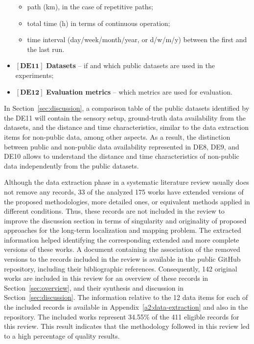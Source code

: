 \begin{itemize}[nosep]
\begin{itemize}[nosep]
  \item path (km), in the case of repetitive paths;
  \item total time (h) in terms of continuous operation;
  \item time interval (day/week/month/year, or d/w/m/y) between the first and the last run.
  \end{itemize}
\item $\left[\textbf{DE11}\right]$ \textbf{Datasets} -- if and which public datasets are used in the experiments;
\item $\left[\textbf{DE12}\right]$ \textbf{Evaluation metrics} -- which metrics are used for evaluation.
\end{itemize}

In Section~\ref{sec:discussion}, a comparison table of the public datasets identified by the DE11 will contain the sensory setup, ground-truth data availability from the datasets, and the distance and time characteristics, similar to the data extraction items for non-public data, among other aspects. As a result, the distinction between public and non-public data availability represented in DE8, DE9, and DE10 allows to understand the distance and time characteristics of non-public data independently from the public datasets.

Although the data extraction phase in a systematic literature review usually does not remove any records, 33 of the analyzed 175 works have extended versions of the proposed methodologies, more detailed ones, or equivalent methods applied in different conditions.
Thus, these records are not included in the review to improve the discussion section in terms of singularity and originality of proposed approaches for the long-term localization and mapping problem.
The extracted information helped identifying the corresponding extended and more complete versions of these works.
A document containing the association of the removed versions to the records included in the review is available in the public GitHub repository, including their bibliographic references. 
Consequently, 142 original works are included in this review for an overview of these records in Section~\ref{sec:overview}, and their synthesis and discussion in Section~\ref{sec:discussion}. The information relative to the 12 data items for each of the included records is available in Appendix~\ref{a2:data-extraction} and also in the repository. The included works represent 34.55\% of the 411 eligible records for this review. This result indicates that the methodology followed in this review led to a high percentage of quality results.


